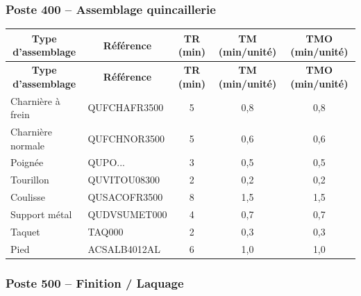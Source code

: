 \documentclass[12pt,a4paper]{article}
\begin{document}
\subsubsection{Poste 400 – Assemblage quincaillerie}

\begin{longtable}{|p{5cm}|p{5cm}|c|c|c|}
\hline
\multicolumn{1}{|c|}{\textbf{Type d'assemblage}} & \multicolumn{1}{c|}{\textbf{Référence}} & \multicolumn{1}{c|}{\textbf{TR (min)}} & \multicolumn{1}{c|}{\textbf{TM (min/unité)}} & \multicolumn{1}{c|}{\textbf{TMO (min/unité)}} \\
\hline
\endfirsthead
\hline
\multicolumn{1}{|c|}{\textbf{Type d'assemblage}} & \multicolumn{1}{c|}{\textbf{Référence}} & \multicolumn{1}{c|}{\textbf{TR (min)}} & \multicolumn{1}{c|}{\textbf{TM (min/unité)}} & \multicolumn{1}{c|}{\textbf{TMO (min/unité)}} \\
\hline
\endhead
\hline
\endfoot
Charnière à frein & QUFCHAFR3500 & 5 & 0,8 & 0,8 \\
Charnière normale & QUFCHNOR3500 & 5 & 0,6 & 0,6 \\
Poignée & QUPO... & 3 & 0,5 & 0,5 \\
Tourillon & QUVITOU08300 & 2 & 0,2 & 0,2 \\
Coulisse & QUSACOFR3500 & 8 & 1,5 & 1,5 \\
Support métal & QUDVSUMET000 & 4 & 0,7 & 0,7 \\
Taquet & TAQ000 & 2 & 0,3 & 0,3 \\
Pied & ACSALB4012AL & 6 & 1,0 & 1,0 \\
\hline
\end{longtable}

\subsubsection{Poste 500 – Finition / Laquage}
\end{document}

